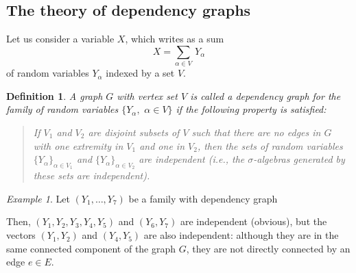 \documentclass[12pt,a4paper,reqno]{amsart}
\newtheorem{definition}[lemma]{Definition}
\theoremstyle{remark}
\newtheorem{example}[lemma]{Example}
\begin{document}
\subsection{The theory of dependency graphs}
\label{subsec:dependencygraphs}
Let us consider a variable $X$, which writes as a sum
$$X=\sum_{\alpha \in V} \,Y_\alpha$$
of random variables $Y_\alpha$ indexed by a set $V$.

\begin{definition}
A graph $G$ with vertex set $V$ is called a {\em dependency graph} for the family of random variables $\{Y_\alpha,\,\, \alpha \in V\}$ if the following property is satisfied:\vspace{2mm}
\begin{quote}
If $V_1$ and $V_2$ are disjoint subsets of $V$ such that there are no edges in $G$ with one extremity in $V_1$ and one in $V_2$, then the sets of random variables $\{Y_\alpha\}_{\alpha \in V_1}$ and $\{Y_\alpha\}_{\alpha \in V_2}$ are independent ({\em i.e.}, the $\sigma$-algebras generated by these sets are independent).
\end{quote}
\end{definition}\medskip

\begin{example}
Let $(Y_1,\ldots,Y_7)$ be a family with dependency graph
\begin{center}
\end{center}
Then, $(Y_1,Y_2,Y_3,Y_4,Y_5)$ and $(Y_6,Y_7)$ are independent (obvious), but the vectors $(Y_1,Y_2)$ and $(Y_4,Y_5)$ are also independent: although they are in the same connected component of the graph $G$, they are not directly connected by an edge $e \in E$.
\end{example}
\medskip
\end{document}

